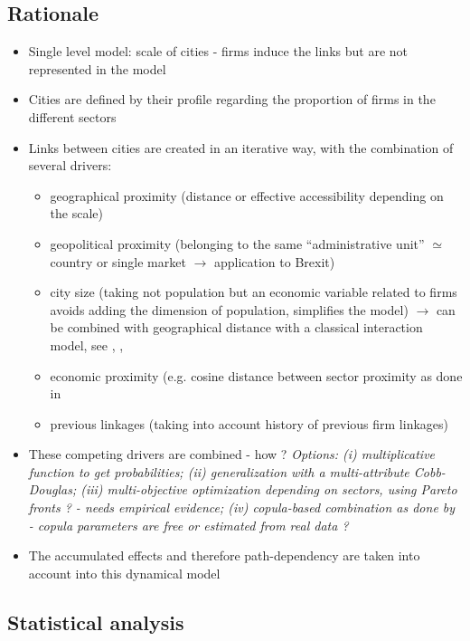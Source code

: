 \documentclass{article}
\begin{document}
\subsection{Rationale}

\begin{itemize}
    \item Single level model: scale of cities - firms induce the links but are not represented in the model
    \item Cities are defined by their profile regarding the proportion of firms in the different sectors
    \item Links between cities are created in an iterative way, with the combination of several drivers:
    \begin{itemize}
        \item geographical proximity (distance or effective accessibility depending on the scale)
        \item geopolitical proximity (belonging to the same ``administrative unit'' $\simeq$ country or single market $\rightarrow$ application to Brexit)
        \item city size (taking not population but an economic variable related to firms avoids adding the dimension of population, simplifies the model) $\rightarrow$ can be combined with geographical distance with a classical interaction model, see \cite{cottineau2015growing}, \cite{raimbault2018indirect}, \cite{favaro2011gibrat}
        \item economic proximity (e.g. cosine distance between sector proximity as done in \cite{2019arXiv190505106C}
        \item previous linkages (taking into account history of previous firm linkages)
    \end{itemize}
    \item These competing drivers are combined - how ? \textit{Options: (i) multiplicative function to get probabilities; (ii) generalization with a multi-attribute Cobb-Douglas; (iii) multi-objective optimization depending on sectors, using Pareto fronts ? - needs empirical evidence; (iv) copula-based combination as done by \cite{2019arXiv190505106C} - copula parameters are free or estimated from real data ?}
    \item The accumulated effects and therefore path-dependency are taken into account into this dynamical model
\end{itemize}


\subsection{Statistical analysis}
\end{document}
